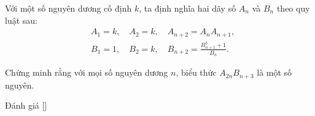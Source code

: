 \ifshowproblem
\begin{problem}\label{problem:KOR-2015-TST-P5}
    Với một số nguyên dương cố định \( k \), ta định nghĩa hai dãy số \( A_n \) và \( B_n \) theo quy luật sau:
    \[
        \begin{aligned}
            &A_1 = k,\quad A_2 = k,\quad A_{n+2} = A_n A_{n+1}, \\
            &B_1 = 1,\quad B_2 = k,\quad B_{n+2} = \frac{B_{n+1}^3 + 1}{B_n}.
        \end{aligned}
    \]
    
    Chứng minh rằng với mọi số nguyên dương \( n \), biểu thức \( A_{2n} B_{n+3} \) là một số nguyên.
\end{problem}
\fi

\ifshowinfo
Đánh giá [\textbf{}]\footnotemark
{}
\fi